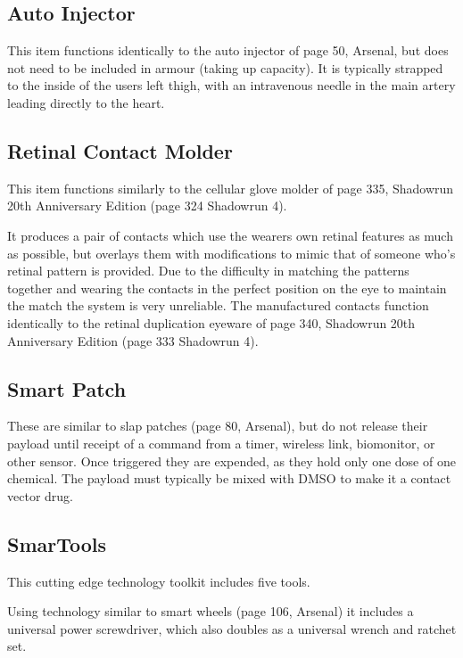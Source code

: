 \documentclass{article}
\begin{document}
\subsection*{Auto Injector}

This item functions identically to the auto injector of page 50, Arsenal, but does not need to be included in armour (taking up capacity).  It is typically strapped to the inside of the users left thigh, with an intravenous needle in the main artery leading directly to the heart.

\subsection*{Retinal Contact Molder}

This item functions similarly to the cellular glove molder of page 335, Shadowrun 20th Anniversary Edition (page 324 Shadowrun 4).  

  It produces a pair of contacts which use the wearers own retinal features as much as possible, but overlays them with modifications to mimic that of someone who's retinal pattern is provided.  Due to the difficulty in matching the patterns together and wearing the contacts in the perfect position on the eye to maintain the match the system is very unreliable.  The manufactured contacts function identically to the retinal duplication eyeware of page 340, Shadowrun 20th Anniversary Edition (page 333 Shadowrun 4).

\subsection*{Smart Patch}

  These are similar to slap patches (page 80, Arsenal), but do not release their payload until receipt of a command from a timer, wireless link, biomonitor, or other sensor.  Once triggered they are expended, as they hold only one dose of one chemical.  The payload must typically be mixed with DMSO to make it a contact vector drug.

\subsection*{SmarTools}

  This cutting edge technology toolkit includes five tools.

  Using technology similar to smart wheels (page 106, Arsenal) it includes a universal power screwdriver, which also doubles as a universal wrench and ratchet set.
  
\end{document}
